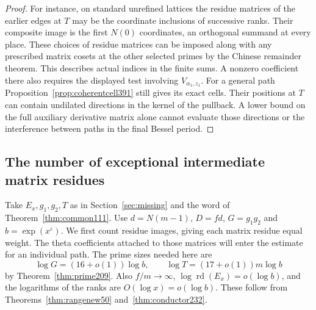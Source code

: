 \documentclass[a4paper,11pt]{article}
\theoremstyle{definition}
\theoremstyle{remark}
\numberwithin{equation}{section}
\begin{document}
\begin{proof}
For instance, on standard unrefined lattices the residue
matrices of the earlier edges at \(T\) may be the coordinate
inclusions of successive ranks. Their composite image is the
first \(N(0)\) coordinates, an orthogonal summand at every
place. These choices of residue matrices can be imposed along
with any prescribed matrix cosets at the other selected primes
by the Chinese remainder theorem. This describes actual
indices in the finite sums. A nonzero coefficient there also
requires the displayed test involving \(V_{\alpha_1,z_1}\).
For a general path Proposition~\ref{prop:coherentcell391} still
gives its exact cells. Their positions at \(T\) can contain
undilated directions in the kernel of the pullback. A lower
bound on the full auxiliary derivative matrix alone cannot
evaluate those directions or the interference between paths
in the final Bessel period.
\end{proof}


\subsection{The number of exceptional intermediate matrix residues}
\label{sec:intermediateimages392}

Take \(E_x,g_1,g_2,T\) as in Section~\ref{sec:missing} and the
word of Theorem~\ref{thm:common111}. Use \(d=N(m-1)\),
\(D=fd\), \(G=g_1g_2\) and \(b=\exp(x^\varepsilon)\).
We first count residue images, giving each matrix residue equal
weight. The theta coefficients attached to those matrices will
enter the estimate for an individual path. The prime sizes
needed here are
\[
       \log G=(16+o(1))\log b,\qquad
       \log T=(17+o(1))m\log b
\]
by Theorem~\ref{thm:prime209}. Also \(f/m\to\infty\),
\(\log \operatorname{rd}(E_x)=o(\log b)\), and the logarithms
of the ranks are \(O(\log x)=o(\log b)\). These follow from
Theorems~\ref{thm:rangenew50} and~\ref{thm:conductor232}.
\end{document}
